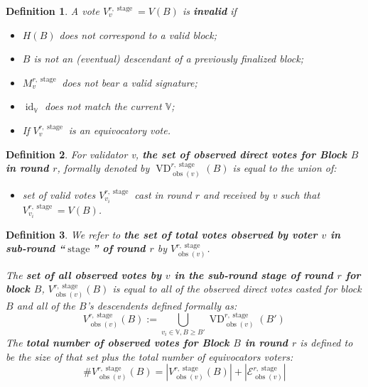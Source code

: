 \documentclass{book}
\newcommand{\assign}{:=}
\newcommand{\nosymbol}{}
\newcommand{\tmop}[1]{\ensuremath{\operatorname{#1}}}
\newcommand{\tmstrong}[1]{\textbf{#1}}
\newcommand{\tmtextbf}[1]{{\bfseries{#1}}}
\newenvironment{itemizedot}{\begin{itemize} \renewcommand{\labelitemi}{$\bullet$}\renewcommand{\labelitemii}{$\bullet$}\renewcommand{\labelitemiii}{$\bullet$}\renewcommand{\labelitemiv}{$\bullet$}}{\end{itemize}}
\newtheorem{definition}{Definition}
\providecommand{\nosymbol}{}
\providecommand{\tmop}[1]{\ensuremath{\mathrm{#1}}}
\providecommand{\tmstrong}[1]{\tmtextbf{#1}}
\providecommand{\tmtextbf}[1]{\tmtextbf{#1}}
\newtheorem{definition}{Definition}
\begin{document}
\begin{definition}
  A vote $V_v^{r, \tmop{stage}} = V (B)$ is {\tmstrong{invalid}} if
  \begin{itemize}
    \begin{itemizedot}
      \item $H (B)$ does not correspond to a valid block;
      
      \item $B$ is not an (eventual) descendant of a previously finalized
      block;
      
      \item $M^{r, \tmop{stage}}_v$ does not bear a valid signature;
      
      \item $\tmop{id}_{\mathbb{V}}$ does not match the current $\mathbb{V}$;
      
      \item If $V_v^{r, \tmop{stage}}$ is an equivocatory vote.
    \end{itemizedot}
  \end{itemize}
\end{definition}

\begin{definition}
  For validator v, {\tmstrong{the set of observed direct votes for Block $B$
  in round $r$}}, formally denoted by $\tmop{VD}^{r, \tmop{stage}}_{\tmop{obs}
  (v)}^{\nosymbol}_{\nosymbol} (B)$ is equal to the union of:
  \begin{itemizedot}
    \item set of valid votes $V^{r, \tmop{stage}}_{v_i}$ cast in round $r$ and
    received by v such that $V^{r, \tmop{stage}}_{v_i} = V (B)$.
  \end{itemizedot}
\end{definition}

\begin{definition}
  We refer to {\tmstrong{the set of total votes observed by voter $v$ in
  sub-round ``$\tmop{stage}$'' of round $r$}} by {\tmstrong{$V^{r,
  \tmop{stage}}_{\tmop{obs} (v)}^{\nosymbol}_{\nosymbol}$}}.
  
  The {\tmstrong{set of all observed votes by $v$ in the sub-round stage of
  round $r$ for block $B$}}, {\tmstrong{$V^{r, \tmop{stage}}_{\tmop{obs} (v)}
  (B)$}} is equal to all of the observed direct votes casted for block $B$ and
  all of the $B$'s descendents defined formally as:
  \[ V^{r, \tmop{stage}}_{\tmop{obs} (v)} (B) \assign \bigcup_{v_i \in
     \mathbb{V}, B \geqslant B'} \tmop{VD}^{r, \tmop{stage}}_{\tmop{obs} (v)}
     (B')_{\nosymbol}^{\nosymbol}_{\nosymbol} \]
  The {\tmstrong{total number of observed votes for Block $B$ in round $r$}}
  is defined to be the size of that set plus the total number of equivocators
  voters:
  \[ \#V^{r, \tmop{stage}}_{\tmop{obs} (v)} (B) = |V^{r,
     \tmop{stage}}_{\tmop{obs} (v)} (B) | + | \mathcal{E}^{r,
     \tmop{stage}}_{\tmop{obs} (v)} | \]
\end{definition}
\end{document}
